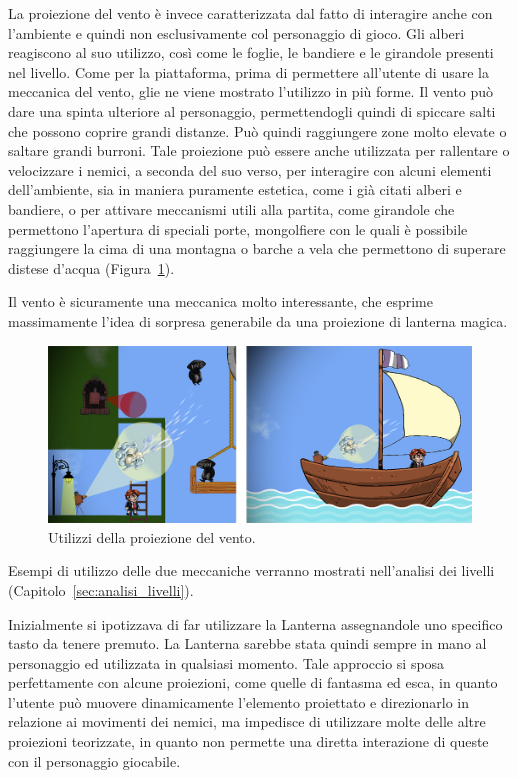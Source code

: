 La proiezione del vento è invece caratterizzata dal fatto di interagire anche con l’ambiente e quindi non esclusivamente col personaggio di gioco. Gli alberi reagiscono al suo utilizzo, così come le foglie, le bandiere e le girandole presenti nel livello.
Come per la piattaforma, prima di permettere all’utente di usare la meccanica del vento, glie ne viene mostrato l’utilizzo in più forme.
Il vento può dare una spinta ulteriore al personaggio, permettendogli quindi di spiccare salti che possono coprire grandi distanze. Può quindi raggiungere zone molto elevate o saltare grandi burroni.
Tale proiezione può essere anche utilizzata per rallentare o velocizzare i nemici, a seconda del suo verso, per interagire con alcuni elementi dell’ambiente, sia in maniera puramente estetica, come i già citati alberi e bandiere, o per attivare meccanismi utili alla partita, come girandole che permettono l’apertura di speciali porte, mongolfiere con le quali è possibile raggiungere la cima di una montagna o barche a vela che permettono di superare distese d’acqua (Figura~\ref{fig:meccaniche_precinema_vento}).

Il vento è sicuramente una meccanica molto interessante, che esprime massimamente l’idea di sorpresa generabile da una proiezione di lanterna magica.

\begin{figure}%
	\centering
	\includegraphics[width= \columnwidth]{images/gameDesign/20_vento.jpg}
	\caption{Utilizzi della proiezione del vento.}
	\label{fig:meccaniche_precinema_vento}
\end{figure}

Esempi di utilizzo delle due meccaniche verranno mostrati nell’analisi dei livelli (Capitolo~\ref{sec:analisi_livelli}).

Inizialmente si ipotizzava di far utilizzare la Lanterna assegnandole uno specifico tasto da tenere premuto. La Lanterna sarebbe stata quindi sempre in mano al personaggio ed utilizzata in qualsiasi momento. Tale approccio si sposa perfettamente con alcune proiezioni, come quelle di fantasma ed esca, in quanto l’utente può muovere dinamicamente l’elemento proiettato e direzionarlo in relazione ai movimenti dei nemici, ma impedisce di utilizzare molte delle altre proiezioni teorizzate, in quanto non permette una diretta interazione di queste con il personaggio giocabile.


